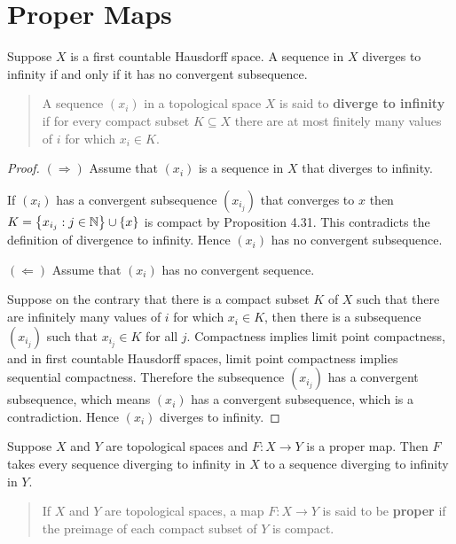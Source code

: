 \section*{Proper Maps}

\begin{lemma}{4.91}\label{lemma:4.91}
	Suppose $X$ is a first countable Hausdorff space. A sequence in $X$ diverges to infinity if and only if it has no convergent subsequence.
\end{lemma}

\begin{quote}
	A sequence ${(x_{i})}$ in a topological space $X$ is said to \textbf{diverge to infinity} if for every compact subset $K\subseteq X$ there are at most finitely many values of $i$ for which $x_{i} \in K$.
\end{quote}

\begin{proof}
	$(\Longrightarrow)$ Assume that ${(x_{i})}$ is a sequence in $X$ that diverges to infinity.

	If ${(x_{i})}$ has a convergent subsequence ${(x_{i_{j}})}$ that converges to $x$ then $K = \left\{{ x_{i_{j}} : j\in\mathbb{N} }\right\} \cup \left\{{x}\right\}$ is compact by Proposition 4.31. This contradicts the definition of divergence to infinity. Hence ${(x_{i})}$ has no convergent subsequence.

	$(\Longleftarrow)$ Assume that ${(x_{i})}$ has no convergent sequence.

	Suppose on the contrary that there is a compact subset $K$ of $X$ such that there are infinitely many values of $i$ for which $x_{i} \in K$, then there is a subsequence ${(x_{i_{j}})}$ such that $x_{i_{j}}\in K$ for all $j$. Compactness implies limit point compactness, and in first countable Hausdorff spaces, limit point compactness implies sequential compactness. Therefore the subsequence ${(x_{i_{j}})}$ has a convergent subsequence, which means ${(x_{i})}$ has a convergent subsequence, which is a contradiction. Hence ${(x_{i})}$ diverges to infinity.
\end{proof}

\begin{prop}{4.92}
	Suppose $X$ and $Y$ are topological spaces and $F: X\to Y$ is a proper map. Then $F$ takes every sequence diverging to infinity in $X$ to a sequence diverging to infinity in $Y$.
\end{prop}

\begin{quote}
	If $X$ and $Y$ are topological spaces, a map $F: X\to Y$ is said to be \textbf{proper} if the preimage of each compact subset of $Y$ is compact.
\end{quote}

